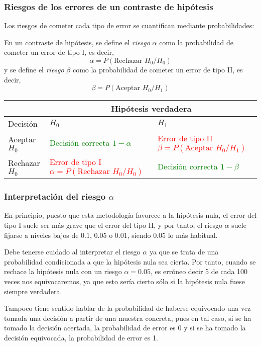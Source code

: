 \begin{frame}
\frametitle{Riesgos de los errores de un contraste de hipótesis}
Los riesgos de cometer cada tipo de error se cuantifican mediante probabilidades:

\begin{definicion}
En un contraste de hipótesis, se define el \emph{riesgo} $\alpha$ como la probabilidad de cometer un error de tipo I, es
decir,
\[
\alpha = P(\text{Rechazar }H_0/H_0)
\]
y se define el \emph{riesgo} $\beta$ como la probabilidad de cometer un error de tipo II, es decir,
\[
\beta = P(\text{Aceptar }H_0/H_1)
\]
\end{definicion}

\begin{center}
\smallsize
\begin{tabular}{|m{2.2cm}<{\centering}|m{4cm}<{\centering}|m{4cm}<{\centering}|}
\cline{2-3}
\multicolumn{1}{c|}{} & \multicolumn{2}{|c|}{Hipótesis verdadera}\\
\hline
Decisión & $H_0$ & $H_1$\\ \hline
Aceptar $H_0$ & \textcolor{green}{Decisión correcta\newline $1-\alpha$}&
\textcolor{red}{Error de tipo II\newline $\beta=P(\text{Aceptar }H_0/H_1)$}\\ 
\hline 
Rechazar $H_0$ & \textcolor{red}{Error de tipo I\newline $\alpha = P(\text{Rechazar }H_0/H_0)$} &
\textcolor{green}{Decisión correcta \newline $1-\beta$}\\ 
\hline
\end{tabular}
\end{center}
\end{frame}


\begin{frame}
\frametitle{Interpretación del riesgo $\alpha$}
En principio, puesto que esta metodología favorece a la hipótesis nula, el error del tipo I
suele ser más grave que el error del tipo II, y por tanto, el riesgo $\alpha$ suele fijarse a niveles bajos de $0.1$,
$0.05$ o $0.01$, siendo $0.05$ lo más habitual. 

Debe tenerse cuidado al interpretar el riesgo $\alpha$ ya que se trata de una probabilidad condicionada a que la
hipótesis nula sea cierta.
Por tanto, cuando se rechace la hipótesis nula con un riesgo $\alpha=0.05$, es erróneo
decir 5 de cada 100 veces nos equivocaremos, ya que esto sería cierto sólo si la hipótesis nula fuese siempre verdadera.

Tampoco tiene sentido hablar de la probabilidad de haberse equivocado una vez tomada una decisión a partir de una
muestra concreta, pues en tal caso, si se ha tomado la decisión acertada, la probabilidad de error es 0 y si se ha
tomado la decisión equivocada, la probabilidad de error es 1. 
\end{frame}


